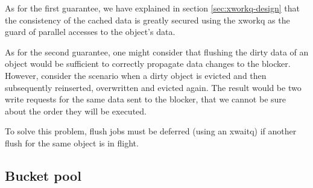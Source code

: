 \begin{comment}
Cache coherence is a concept that is closely connected with concurrency 
control, as is evident in Figure \ref{fig:cached-design.pdf}. It is commonly 
used as a term in the literature on the subject of caches for multiprocessor 
systems or distributed caches and it refers to:

\begin{enumerate}
	\item the consistency of data that are stored in the cache and
	\item how each change is propagated through the system, to the other 
		storage tiers.\label{list:second-coherence}
\end{enumerate}

If we wanted to rephrase the above to match our case, we could say that it 
refers to the consistency of the data that are stored in cached and how each 
change is propagated to the blocker.
\end{comment}

As for the first guarantee, we have explained in section 
\ref{sec:xworkq-design} that the consistency of the cached data is greatly 
secured using the xworkq as the guard of parallel accesses to the object's 
data.

\begin{comment}
The problem is evident if you consider the eviction of an object with dirty 
data. xcache does not operate on object level and thus is unaware of the 
contents of the cache entry. Thus, cached must use the cache entry finalization 
hook to increment the refcount of the object so that it can not be removed 
until all data have been flushed to the blocker. Essentially, cached overrides 
the xcache's book-keeping to maintain cache coherency.
\end{comment}

As for the second guarantee, one might consider that flushing the dirty data of 
an object would be sufficient to correctly propagate data changes to the 
blocker.  However, consider the scenario when a dirty object is evicted and 
then subsequently reinserted, overwritten and evicted again. The result would 
be two write requests for the same data sent to the blocker, that we cannot be 
sure about the order they will be executed.

To solve this problem, flush jobs must be deferred (using an xwaitq) if another 
flush for the same object is in flight. 

\subsection{Bucket pool}


